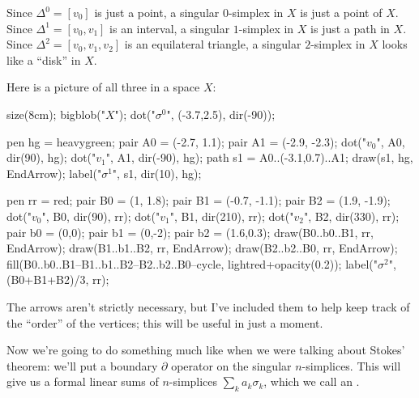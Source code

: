 \begin{example}
	\listhack
	\label{ex:simplex}
	\begin{enumerate}[(a)]
		\ii Since $\Delta^0 = [v_0]$ is just a point,
		a singular $0$-simplex in $X$ is just a point of $X$.
		\ii Since $\Delta^1 = [v_0, v_1]$ is an interval,
		a singular $1$-simplex in $X$ is just a path in $X$.
		\ii Since $\Delta^2 = [v_0, v_1, v_2]$ is an equilateral triangle,
		a singular $2$-simplex in $X$ looks like a ``disk'' in $X$.
	\end{enumerate}
	Here is a picture of all three in a space $X$:
	\begin{center}
		\begin{asy}
			size(8cm);
			bigblob("$X$");
			dot("$\sigma^0$", (-3.7,2.5), dir(-90));

			pen hg = heavygreen;
			pair A0 = (-2.7, 1.1);
			pair A1 = (-2.9, -2.3);
			dot("$v_0$", A0, dir(90), hg);
			dot("$v_1$", A1, dir(-90), hg);
			path s1 = A0..(-3.1,0.7)..A1;
			draw(s1, hg, EndArrow);
			label("$\sigma^1$", s1, dir(10), hg);

			pen rr = red;
			pair B0 = (1, 1.8);
			pair B1 = (-0.7, -1.1);
			pair B2 = (1.9, -1.9);
			dot("$v_0$", B0, dir(90), rr);
			dot("$v_1$", B1, dir(210), rr);
			dot("$v_2$", B2, dir(330), rr);
			pair b0 = (0,0);
			pair b1 = (0,-2);
			pair b2 = (1.6,0.3);
			draw(B0..b0..B1, rr, EndArrow);
			draw(B1..b1..B2, rr, EndArrow);
			draw(B2..b2..B0, rr, EndArrow);
			fill(B0..b0..B1--B1..b1..B2--B2..b2..B0--cycle, lightred+opacity(0.2));
			label("$\sigma^2$", (B0+B1+B2)/3, rr);
		\end{asy}
	\end{center}
	The arrows aren't strictly necessary, but I've included them
	to help keep track of the ``order'' of the vertices;
	this will be useful in just a moment.
\end{example}

Now we're going to do something much like
when we were talking about Stokes' theorem:
we'll put a boundary $\partial$ operator on the singular $n$-simplices.
This will give us a formal linear sums of $n$-simplices $\sum_k a_k \sigma_k$,
which we call an .

